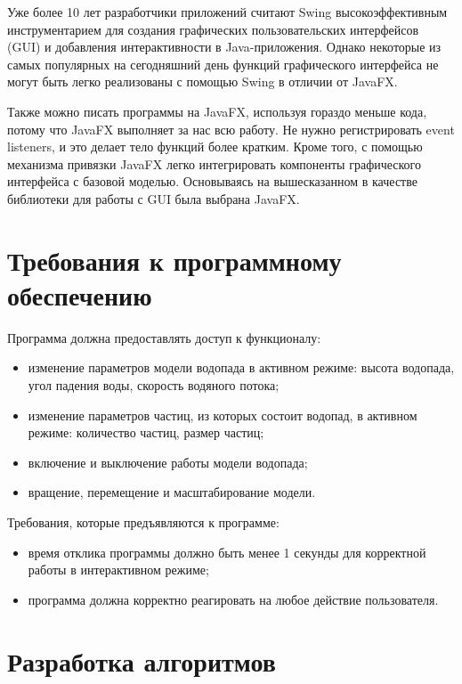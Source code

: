 Уже более 10 лет разработчики приложений считают Swing высокоэффективным инструментарием для создания графических пользовательских интерфейсов (GUI) и добавления интерактивности в Java-приложения. Однако некоторые из самых популярных на сегодняшний день функций графического интерфейса не могут быть легко реализованы с помощью Swing в отличии от JavaFX. 

Также можно писать программы на JavaFX, используя гораздо меньше кода, потому что JavaFX выполняет за нас всю работу. Не нужно регистрировать event listeners, и это делает тело функций более кратким. Кроме того, с помощью механизма привязки JavaFX легко интегрировать компоненты графического интерфейса с базовой моделью. Основываясь на вышесказанном в качестве библиотеки для работы с GUI была выбрана JavaFX.


\section{Требования к программному обеспечению}

Программа должна предоставлять доступ к функционалу:

\begin{itemize}
    \item изменение параметров модели водопада в активном режиме: высота водопада, угол падения воды, скорость водяного потока;
    \item изменение параметров частиц, из которых состоит водопад, в активном режиме: количество частиц, размер частиц;
    \item включение и выключение работы модели водопада;
    \item вращение, перемещение и масштабирование модели.
\end{itemize}

Требования, которые предъявляются к программе:

\begin{itemize}
    \item время отклика программы должно быть менее 1 секунды для корректной работы в интерактивном режиме;
    \item программа должна корректно реагировать на любое действие пользователя.
\end{itemize}


\section{Разработка алгоритмов}

